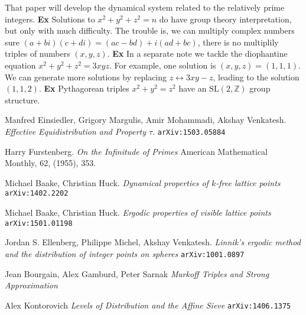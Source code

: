 \documentclass[12pt]{article}
\newcommand{\next}{\newline \newline \noindent}
\begin{document}
{\noindent That paper will develop the dynamical system related to the relatively prime integers.  \next
\textbf{Ex} Solutions to $x^2 + y^2 + z^2 = n$ do have group theory interpretation, but only with much difficulty. \cite{EMV}  The trouble is, we can multiply complex numbers sure $(a+bi)(c+di) = (ac-bd) + i(ad+bc)$, there is no multiplily triples of numbers $(x,y,z)$. \next
\textbf{Ex} In a separate note we tackle the diophantine equation $x^2 + y^2 + z^2 = 3 xyz$.  For example, one solution is $(x,y,z) = (1,1,1)$.  We can generate more solutions by replacing $z \leftrightarrow 3xy - z$, leading to the solution $(1,1,2)$. \next
\textbf{Ex} Pythagorean triples $x^2 + y^2 = z^2$ have an $\mathrm{SL}(2,\mathbb{Z})$ group structure.  \cite{K}

\begin{thebibliography}{9}
Manfred Einsiedler, Grigory Margulis, Amir Mohammadi, Akshay Venkatesh.
\textit{Effective Equidistribution and Property $\tau$}.  \texttt{arXiv:1503.05884}
 
Harry Furstenberg.  \textit{On the Infinitude of Primes} American Mathematical Monthly, 62, (1955), 353.

Michael Baake, Christian Huck.  \textit{Dynamical properties of $k$-free lattice points} \texttt{ arXiv:1402.2202}

Michael Baake, Christian Huck.  \textit{Ergodic properties of visible lattice points} \texttt{arXiv:1501.01198}

 Jordan S. Ellenberg, Philippe Michel, Akshay Venkatesh. \textit{Linnik's ergodic method and the distribution of integer points on spheres} \texttt{arXiv:1001.0897}

 Jean Bourgain, Alex Gamburd, Peter Sarnak \textit{Markoff Triples and Strong Approximation} \texttt{}

 Alex Kontorovich \textit{Levels of Distribution and the Affine Sieve} \texttt{arXiv:1406.1375}


\end{thebibliography}
}
\end{document}
